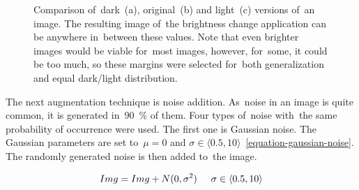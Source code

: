 \begin{figure}[tbh]
    \centering
    \qquad \hspace{-2.34em}
    \qquad \hspace{-2.34em}
    \caption{Comparison of~dark~(a), original~(b) and light~(c) versions of~an image. The resulting image of~the brightness change application can be anywhere in~between these values. Note that even brighter images would be viable for~most images, however, for~some, it could be too much, so these margins were selected for~both generalization and equal dark/light distribution.}
    \label{dataset-keyboards-augmentation-gamma}
\end{figure}

The next augmentation technique is noise addition. As~noise in an image is quite common, it is generated in~90~\% of them. Four types of~noise with~the same probability of occurrence were used. The first one is Gaussian noise. The Gaussian parameters are set to~\(\mu = 0\) and \(\sigma \in \langle0.5, 10\rangle\)~\ref{equation-gaussian-noise}. The randomly generated noise is then added to~the image.

\begin{equation}
  \label{equation-gaussian-noise}
  Img = Img + N(0, \sigma^2) \hspace{0.5cm} \sigma \in \langle0.5, 10\rangle
\end{equation}

